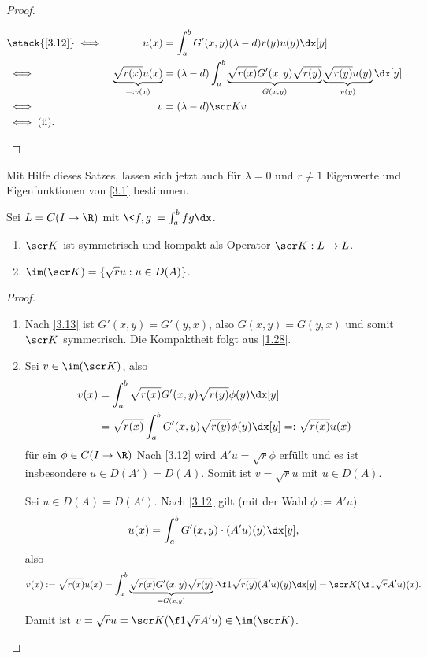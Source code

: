 \begin{st}
\begin{proof}
\begin{enumerate}[1)]
\begin{alignat*}{2}
					&\stack{\ref{3.12}}\iff& u(x) &= \int_a^b G'(x,y) (\lambda -d) r(y) u(y) \dx[y] \\
					&\iff& \underbrace{\sqrt{r(x)} u(x)}_{=:v(x)} &= (\lambda - d) \int_a^b \underbrace{\sqrt{r(x)} G'(x,y) \sqrt{r(y)}}_{G(x,y)} \underbrace{\sqrt{r(y)} u(y)}_{v(y)} \dx[y] \\
					&\iff& v &= (\lambda -d) \scr K v \\
					&\iff \text{(ii).}&&
				\end{alignat*}
		\end{enumerate}
	\end{proof}
	\begin{note}
		Mit Hilfe dieses Satzes, lassen sich jetzt auch für $\lambda = 0$ und $r \neq 1$ Eigenwerte und Eigenfunktionen von \eqref{3.1} bestimmen.
	\end{note}
\end{st}

\begin{lem} \label{3.18}
	Sei $L = C(I \to \R)$ mit $\<f,g\> = \int_a^b fg \dx$.
	\begin{enumerate}[1)]
		\item
			$\scr K$ ist symmetrisch und kompakt als Operator $\scr K : L \to L$.
		\item
			$\im(\scr K) = \{\sqrt{r} u : u \in D(A)\}$.
	\end{enumerate}
	\begin{proof}
		\begin{enumerate}[1)]
			\item
				Nach \ref{3.13} ist $G'(x,y) = G'(y,x)$, also $G(x,y) = G(y,x)$ und somit $\scr K$ symmetrisch.
				Die Kompaktheit folgt aus \ref{1.28}.
			\item
				\begin{segnb}[„$\subset$“]
					Sei $v \in \im(\scr K)$, also
					\begin{align*}
						v(x) 
						&= \int_a^b \sqrt{r(x)} G'(x,y) \sqrt{r(y)} \phi(y) \dx[y] \\
						&= \sqrt{r(x)} \int_a^b G'(x,y) \sqrt{r(y)} \phi(y) \dx[y] =: \sqrt{r(x)} u(x)
					\end{align*}
					für ein $\phi \in C(I \to \R)$
					Nach \ref{3.12} wird $A'u= \sqrt{r} \phi$ erfüllt und es ist insbesondere $u \in  D(A') = D(A)$.
					Somit ist $v = \sqrt{r} u$ mit $u \in D(A)$.
				\end{segnb}
				\begin{segnb}[„$\supset$“]
					Sei $u \in D(A) = D(A')$.
					Nach \ref{3.12} gilt (mit der Wahl $\phi := A'u$)
					\[
						u(x) = \int_a^b G'(x,y) \cdot (A'u)(y) \dx[y],
					\]
					also
					\begin{align*}
						v(x)
						:= \sqrt{r(x)} u(x)
						= \int_a^b \underbrace{\sqrt{r(x)}G'(x,y)\sqrt{r(y)}}_{=G(x,y)} \cdot \f 1{\sqrt{r(y)}} (A'u)(y) \dx[y]
						= \scr K (\f 1{\sqrt{r}} A'u)(x).
					\end{align*}
					Damit ist $v = \sqrt r u = \scr K(\f 1{\sqrt r} A'u) \in \im(\scr K)$.
				\end{segnb}
		\end{enumerate}
	\end{proof}
\end{lem}

